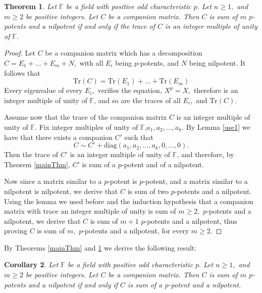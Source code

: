 \documentclass[11pt]{amsart}
\newtheorem{thm}{Theorem}
\newtheorem{cor}[thm]{Corollary}
\theoremstyle{definition}
\numberwithin{equation}{section}
\newcommand{\Tr}{{\mathrm{Tr}}}
\newcommand{\diag}{\mathrm{diag}}
\newcommand{\F}{\mathbb{F}}
\begin{document}
\begin{thm}\label{mppot}
Let $\F$ be a field with positive odd characteristic $p.$ Let $n\geq 1,$ and $m\geq 2$ be positive integers. Let $C$ be a companion matrix. Then $C$ is sum of $m$ $p$-potents and a nilpotent if and only if the trace of $C$ is an integer multiple of unity of $\F.$
\end{thm}
\begin{proof}
Let $C$ be a companion matrix which has a decomposition $C=E_1+\dots+E_m+N,$ with all $E_i$ being $p$-potents, and $N$ being nilpotent.
It follows that $$\Tr(C)=\Tr(E_1)+\dots+\Tr(E_m)$$
Every eigenvalue of every $E_i,$ verifies the equation, $X^p=X,$ therefore is an integer multiple of unity of $\F$, and so are the traces of all $E_i,$ and $\Tr(C).$

Assume now that the trace of the companion matrix $C$ is an integer multiple of unity of $\F.$ Fix integer multiples of unity of $\F$,$a_1,a_2,\dots,a_k.$ By Lemma \ref{use1} we have that there exists a companion $C'$ such that
$$C\sim C'+\diag (a_1,a_2,\dots,a_k,0,\dots,0).$$
Then the trace of $C'$ is an integer multiple of unity of $\F$, and therefore, by Theorem \ref{mainThm}, $C'$ is sum of a $p$-potent and of a nilpotent.

 Now since a matrix similar to a $p$-potent is $p$-potent, and a matrix similar to a nilpotent is nilpotent, we derive that $C$ is sum of two $p$-potents and a nilpotent. Using the lemma we used before and the induction hypothesis that a companion matrix with trace an integer multiple of unity is sum of $m\geq 2,$ $p$-potents and a nilpotent, we derive that $C$ is sum of $m+1$ $p$-potents and a nilpotent, thus proving $C$ is sum of $m,$ $p$-potents and a nilpotent, for every $m\geq 2.$
\end{proof}

By Theorems \ref{mainThm} and \ref{mppot} we derive the following result:

\begin{cor}
Let $\F$ be a field with positive odd characteristic $p.$ Let $n\geq 1,$ and $m\geq 2$ be positive integers.
Let $C$ be a companion matrix. Then $C$ is sum of $m$ $p$-potents and a nilpotent if and only if $C$ is sum of a $p$-potent and a nilpotent.
\end{cor}
\end{document}
